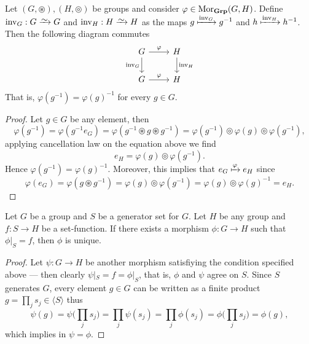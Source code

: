 \begin{proposition}
\label{prop:grp-morphism-commute-inverse}
Let \((G, \circledast), (H, \circledcirc)\) be groups and consider \(\varphi \in
\operatorname{Mor}_{\textbf{Grp}}(G, H)\). Define \(\operatorname{inv}_G: G \isoto G\) and
\(\operatorname{inv}_H: H \isoto H\) as the maps \(g \xmapsto
{\operatorname{inv}_G} g^{-1}\) and \(h \xmapsto {\operatorname{inv}_H}
h^{-1}\). Then the following diagram commutes
\[
  \begin{tikzcd}
    G \ar[r, "\varphi"]
    \ar[d, swap, "\operatorname{inv}_G"]
    &H \ar[d, "\operatorname{inv}_H"] \\
    G \ar[r, "\varphi"] &H
  \end{tikzcd}
\]
That is, \(\varphi(g^{-1}) = \varphi(g)^{-1}\) for every \(g \in G\).
\end{proposition}

\begin{proof}
Let \(g \in G\) be any element, then
\[
  \varphi(g^{-1}) = \varphi(g^{-1} e_G) = \varphi(g^{-1} \circledast g
  \circledast g^{-1}) = \varphi(g^{-1}) \circledcirc \varphi(g) \circledcirc
  \varphi(g^{-1}),
\]
applying cancellation law on the equation above we find
\[
  e_H = \varphi(g) \circledcirc \varphi(g^{-1}).
\]
Hence \(\varphi(g^{-1}) = {\varphi(g)}^{-1}\). Moreover, this implies that \(e_G
\xmapsto \varphi e_H\) since
\[
  \varphi(e_G) = \varphi(g \circledast g^{-1}) = \varphi(g) \circledcirc
  \varphi(g^{-1}) = \varphi(g) \circledcirc {\varphi(g)}^{-1} = e_H.
\]
\end{proof}

\begin{proposition}
\label{prop:generator-unique-extension}
Let \(G\) be a group and \(S\) be a generator set for \(G\). Let \(H\) be any
group and \(f: S \to H\) be a set-function. If there exists a morphism \(\phi: G
\to H\) such that \(\phi|_S = f\), then \(\phi\) is unique.
\end{proposition}

\begin{proof}
Let \(\psi: G \to H\) be another morphism satisfiying the condition specified
above --- then clearly \(\psi|_S = f = \phi|_{S}\), that is, \(\phi\) and
\(\psi\) agree on \(S\). Since \(S\) generates \(G\), every element \(g \in G\)
can be written as a finite product \(g = \prod_{j} s_j \in \langle S \rangle\)
thus
\[
  \psi(g) = \psi\Big( \prod_j s_j \Big)
  = \prod_j \psi(s_j) = \prod_j \phi(s_j)
  = \phi\Big( \prod_j s_j \Big) = \phi(g),
\]
which implies in \(\psi = \phi\).
\end{proof}

